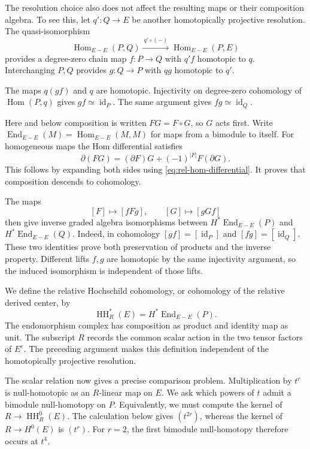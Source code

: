 The resolution choice also does not affect the resulting maps or their
composition algebra. To see this, let $q':Q\to E$ be another
homotopically projective resolution. The quasi-isomorphism
\[
 \operatorname{Hom}_{E-E}(P,Q)\xrightarrow{\ q'\circ(-)\ }
 \operatorname{Hom}_{E-E}(P,E)
\]
provides a degree-zero chain map $f:P\to Q$ with $q'f$ homotopic to $q$.
Interchanging $P,Q$ provides $g:Q\to P$ with $qg$ homotopic to $q'$.

The maps $q(gf)$ and $q$ are homotopic.
Injectivity on degree-zero cohomology of $\operatorname{Hom}(P,q)$ gives
$gf\simeq\operatorname{id}_P$.
The same argument gives $fg\simeq\operatorname{id}_Q$.

Here and below composition is written $FG=F\circ G$, so $G$ acts first.
Write $\operatorname{End}_{E-E}(M)=\operatorname{Hom}_{E-E}(M,M)$
for maps from a bimodule to itself.
For homogeneous maps the Hom differential satisfies
\[
 \partial(FG)=(\partial F)G+(-1)^{|F|}F(\partial G).
\]
This follows by expanding both sides using
\eqref{eq:rel-hom-differential}.
It proves that composition descends to cohomology.

The maps
\[
 [F]\longmapsto[fFg],\qquad [G]\longmapsto[gGf]
\]
then give inverse graded algebra isomorphisms between
$H^*\operatorname{End}_{E-E}(P)$ and
$H^*\operatorname{End}_{E-E}(Q)$.
Indeed, in cohomology $[gf]=[\operatorname{id}_P]$ and
$[fg]=[\operatorname{id}_Q]$.
These two identities prove both preservation of products and the inverse
property. Different lifts $f,g$ are homotopic by the same injectivity
argument, so the induced isomorphism is independent of those lifts.

We define the relative Hochschild cohomology, or cohomology of the
relative derived center, by
\[
 \operatorname{HH}_R^*(E)
   =H^*\operatorname{End}_{E-E}(P).
\]
The endomorphism complex has composition as product and identity map as
unit. The subscript $R$ records the common scalar action in the two tensor
factors of $E^e$. The preceding argument makes this definition independent
of the homotopically projective resolution.

The scalar relation now gives a precise comparison problem.
Multiplication by $t^r$ is null-homotopic as an $R$-linear map on $E$.
We ask which powers of $t$ admit a bimodule null-homotopy on $P$.
Equivalently, we must compute the kernel of
$R\to\operatorname{HH}_R^0(E)$.
The calculation below gives $(t^{2r})$, whereas the kernel of
$R\to H^0(E)$ is $(t^r)$.
For $r=2$, the first bimodule null-homotopy therefore occurs at $t^4$.

